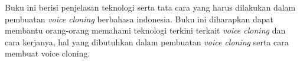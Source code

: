 Buku ini berisi penjelasan teknologi serta tata cara yang harus dilakukan dalam pembuatan \textit{voice cloning} berbahasa indonesia. Buku ini diharapkan dapat membantu orang-orang memahami teknologi terkini terkait \textit{voice cloning} dan cara kerjanya, hal yang dibutuhkan dalam pembuatan \textit{voice cloning} serta cara membuat voice cloning.

